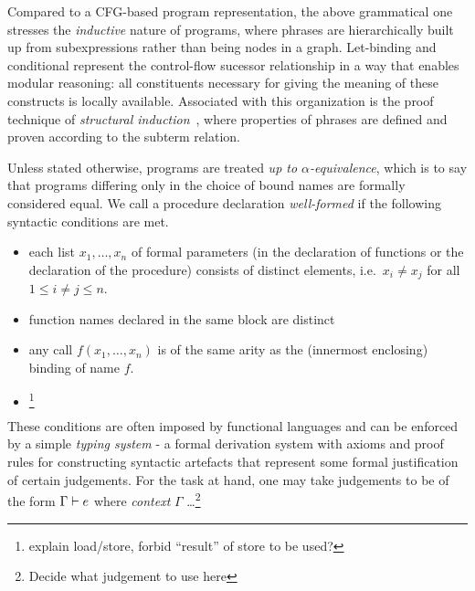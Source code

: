 Compared to a CFG-based program representation, the above grammatical
one stresses the \emph{inductive} nature of programs, where phrases
are hierarchically built up from subexpressions rather than being
nodes in a graph. Let-binding and conditional represent the
control-flow sucessor relationship in a way that enables modular
reasoning: all constituents necessary for giving the meaning of these
constructs is locally available. Associated with this organization is
the proof technique of \emph{structural
induction}~\cite{McCarthy63abasis,Burstall:1969}, where properties of
phrases are defined and proven according to the subterm relation.

Unless stated otherwise, programs are treated 
\emph{up to $\alpha$-equivalence}, which is to say that programs differing only in the choice of bound names are formally considered equal.  We call a
procedure declaration \emph{well-formed} if  the
following syntactic conditions are met.
\begin{itemize}
\item each list $x_1,\ldots,x_n$ of formal parameters (in the declaration of functions or the declaration of the procedure) consists of distinct elements, i.e.~$x_i \neq x_j$ for all $1 \le i \neq j \le n$.
\item function names declared in the same block are distinct
\item any call $f(x_1,\ldots,x_n)$ is of the same arity as the (innermost enclosing) binding of name $f$.
\item \footnote {explain load/store, forbid ``result'' of store to be used?}
\end{itemize}
These conditions are often imposed by functional languages and can be
enforced by a simple \emph{typing system} - a formal derivation system
with axioms and proof rules for constructing syntactic artefacts that
represent some formal justification of certain judgements. For the
task at hand, one may take judgements to be of the form ${\Gamma} \vdash {e}$ where \emph{context} $\Gamma$ \ldots\footnote{Decide what judgement to use here}

